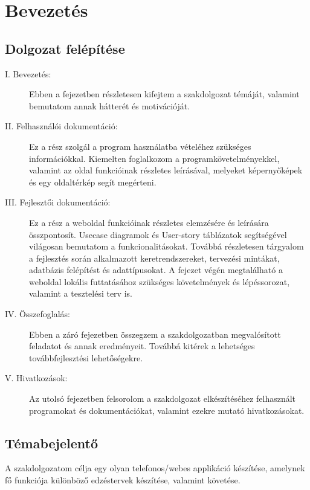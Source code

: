 \chapter{Bevezetés}
\label{ch:bevezetes}

\section{Dolgozat felépítése}

\begin{description}
\item[I. Bevezetés:] Ebben a fejezetben részletesen kifejtem a szakdolgozat témáját, valamint bemutatom annak hátterét és motivációját.

\item[II. Felhasználói dokumentáció:] Ez a rész szolgál a program használatba vételéhez szükséges információkkal. Kiemelten foglalkozom a programkövetelményekkel, valamint az oldal funkcióinak részletes leírásával, melyeket képernyőképek és egy oldaltérkép segít megérteni.

\item[III. Fejlesztői dokumentáció:] Ez a rész a weboldal funkcióinak részletes elemzésére és leírására összpontosít. Usecase diagramok és User-story táblázatok segítségével világosan bemutatom a funkcionalitásokat. Továbbá részletesen tárgyalom a fejlesztés során alkalmazott keretrendszereket, tervezési mintákat, adatbázis felépítést és adattípusokat. A fejezet végén megtalálható a weboldal lokális futtatásához szükséges követelmények és lépéssorozat, valamint a tesztelési terv is.

\item[IV. Összefoglalás:] Ebben a záró fejezetben összegzem a szakdolgozatban megvalósított feladatot és annak eredményeit. Továbbá kitérek a lehetséges továbbfejlesztési lehetőségekre.

\item[V. Hivatkozások:] Az utolsó fejezetben felsorolom a szakdolgozat elkészítéséhez felhasznált programokat és dokumentációkat, valamint ezekre mutató hivatkozásokat.
\end{description}

\section{Témabejelentő}

A szakdolgozatom célja egy olyan telefonos/webes applikáció készítése, amelynek fő funkciója különböző edzéstervek készítése, valamint követése.

